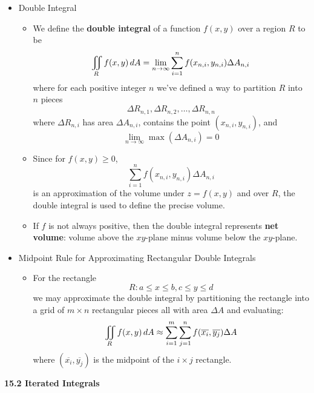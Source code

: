   \begin{itemize}

  \item Double Integral
    \begin{itemize}
    \item We define the \textbf{double integral} of a function $f(x,y)$ over a region $R$ to be 
      \[
        \iint_R f(x,y)\,d{A} = \lim_{n\to\infty}\sum_{i=1}^n f(x_{n,i},y_{n,i})\Delta A_{n,i}
      \]
    where for each positive integer $n$ we've defined a way to partition $R$ into $n$ pieces 
      \[
        \Delta R_{n,1},\Delta R_{n,2},\dots,\Delta R_{n,n}
      \]
    where $\Delta R_{n,i}$ has area $\Delta A_{n,i}$, contains the point $(x_{n,i},y_{n,i})$, and \[\lim_{n\to\infty} \max(\Delta A_{n,i}) = 0\]
    \item Since for $f(x,y)\geq 0$,
      \[
        \sum_{i=1}^n f(x_{n,i},y_{n,i})\Delta A_{n,i}
      \]
      is an approximation of the volume under $z=f(x,y)$ and over $R$, the double integral is used to define the precise volume.
    \item If $f$ is not always positive, then the double integral represents \textbf{net volume}: volume above the $xy$-plane minus volume below the $xy$-plane.
    \end{itemize}

  \item Midpoint Rule for Approximating Rectangular Double Integrals
    \begin{itemize}
      \item For the rectangle
      \[
        R: a\leq x\leq b, c\leq y\leq d
      \]
      we may approximate the double integral by partitioning the rectangle into a grid of $m\times n$ rectangular pieces all with area $\Delta A$ and evaluating:
      \[
        \iint_R f(x,y)\,d{A} \approx \sum_{i=1}^m\sum_{j=1}^n f(\overline{x_i},\overline{y_j}) \Delta A
      \]
      where $(\overline{x_i},\overline{y_j})$ is the midpoint of the $i\times j$ rectangle.
    \end{itemize}

  \end{itemize}

\newpage

\centerline{\bf 15.2 Iterated Integrals}

